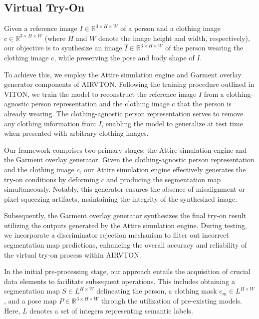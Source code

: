     
    \subsection{Virtual Try-On}
    Given a reference image \( I \in \mathbb{R}^{3 \times H \times W} \) of a person and a clothing image \( c \in \mathbb{R}^{3 \times H \times W} \) (where \( H \) and \( W \) denote the image height and width, respectively), our objective is to synthesize an image \( \hat{I} \in \mathbb{R}^{3 \times H \times W} \) of the person wearing the clothing image \( c \), while preserving the pose and body shape of \( I \).

    To achieve this, we employ the Attire simulation engine and Garment overlay generator components of AIRVTON. Following the training procedure outlined in VITON, we train the model to reconstruct the reference image \( I \) from a clothing-agnostic person representation and the clothing image \( c \) that the person is already wearing. The clothing-agnostic person representation serves to remove any clothing information from \( I \), enabling the model to generalize at test time when presented with arbitrary clothing images.

    Our framework comprises two primary stages: the Attire simulation engine and the Garment overlay generator. Given the clothing-agnostic person representation and the clothing image \( c \), our Attire simulation engine effectively generates the try-on conditions by deforming \( c \) and producing the segmentation map simultaneously. Notably, this generator ensures the absence of misalignment or pixel-squeezing artifacts, maintaining the integrity of the synthesized image.

    Subsequently, the Garment overlay generator synthesizes the final try-on result utilizing the outputs generated by the Attire simulation engine. During testing, we incorporate a discriminator rejection mechanism to filter out incorrect segmentation map predictions, enhancing the overall accuracy and reliability of the virtual try-on process within AIRVTON.

    In the initial pre-processing stage, our approach entails the acquisition of crucial data elements to facilitate subsequent operations. This includes obtaining a segmentation map \( S \in L^{H \times W} \) delineating the person, a clothing mask \( c_m \in L^{H \times W} \), and a pose map \( P \in \mathbb{R}^{3 \times H \times W} \) through the utilization of pre-existing models. Here, \( L \) denotes a set of integers representing semantic labels.

